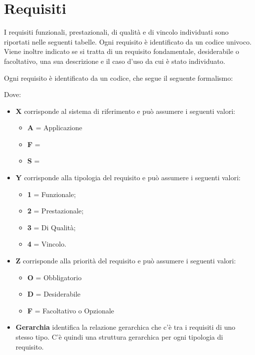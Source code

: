 \section{Requisiti }
I requisiti funzionali, prestazionali, di qualità e di vincolo individuati sono riportati nelle seguenti tabelle. Ogni requisito è identificato da un codice univoco.
Viene inoltre indicato se si tratta di un requisito fondamentale, desiderabile o facoltativo, una sua descrizione e il caso d'uso da cui è stato individuato. 

Ogni requisito è identificato da un codice, che segue il seguente formalismo:
\begin{center}
\end{center}

Dove:
\begin{itemize}
 \item \textbf{X} corrisponde al sistema di riferimento e può assumere i seguenti valori:
		\begin{itemize}
	  	 \item[] \textbf{A} = Applicazione
		 \item[] \textbf{F} = 
		 \item[] \textbf{S} = 
		\end{itemize}

 \item \textbf{Y} corrisponde alla tipologia del requisito e può assumere i seguenti valori:
		\begin{itemize}
		 \item[] \textbf{1} = Funzionale;
		 \item[] \textbf{2} = Prestazionale;
		 \item[] \textbf{3} = Di Qualità;
		 \item[] \textbf{4} = Vincolo.
		\end{itemize}

 \item \textbf{Z} corrisponde alla priorità del requisito e può assumere i seguenti valori:
		\begin{itemize}
		 \item[] \textbf{O} = Obbligatorio
		 \item[] \textbf{D} = Desiderabile
		 \item[] \textbf{F} = Facoltativo o Opzionale
		\end{itemize}

 \item \textbf{Gerarchia} identifica la relazione gerarchica che c'è tra i requisiti di uno stesso tipo. C'è quindi una struttura gerarchica per ogni tipologia di requisito.
\end{itemize}

